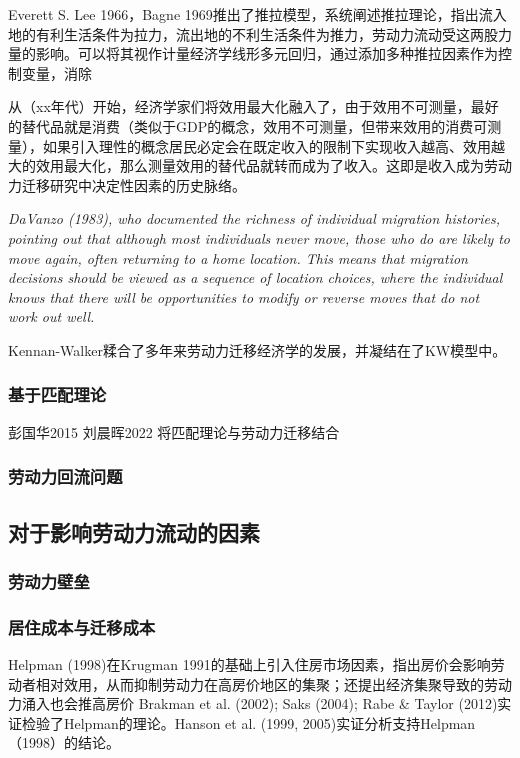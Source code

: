\documentclass{article}
\numberwithin{equation}{section} %
\begin{document}
Everett S. Lee 1966，Bagne 1969推出了推拉模型，系统阐述推拉理论，指出流入地的有利生活条件为拉力，流出地的不利生活条件为推力，劳动力流动受这两股力量的影响。可以将其视作计量经济学线形多元回归，通过添加多种推拉因素作为控制变量，消除

从（xx年代）开始，经济学家们将效用最大化融入了，由于效用不可测量，最好的替代品就是消费（类似于GDP的概念，效用不可测量，但带来效用的消费可测量），如果引入理性的概念居民必定会在既定收入的限制下实现收入越高、效用越大的效用最大化，那么测量效用的替代品就转而成为了收入。这即是收入成为劳动力迁移研究中决定性因素的历史脉络。


\textit{DaVanzo (1983), who documented the richness  of individual migration histories, pointing out that although most individuals never move,  those who do are likely to move again, often returning to a home location. This means  that migration decisions should be viewed as a sequence of location choices, where the  individual knows that there will be opportunities to modify or reverse moves that do not  work out well.}

Kennan-Walker糅合了多年来劳动力迁移经济学的发展，并凝结在了KW模型中。

\subsubsection{基于匹配理论}
彭国华2015
刘晨晖2022
将匹配理论与劳动力迁移结合



\subsubsection{劳动力回流问题}





\subsection{对于影响劳动力流动的因素}

\subsubsection{劳动力壁垒}

\subsubsection{居住成本与迁移成本}
Helpman (1998)在Krugman 1991的基础上引入住房市场因素，指出房价会影响劳动者相对效用，从而抑制劳动力在高房价地区的集聚；还提出经济集聚导致的劳动力涌入也会推高房价
Brakman et al. (2002); Saks (2004); Rabe \& Taylor (2012)实证检验了Helpman的理论。Hanson et al. (1999, 2005)实证分析支持Helpman（1998）的结论。
\end{document}
